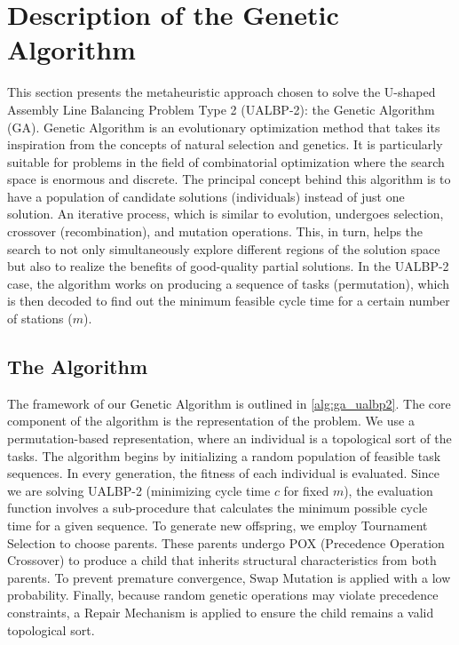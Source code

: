 \documentclass[12pt,a4paper]{article}
\begin{document}
\section{Description of the Genetic Algorithm}
This section presents the metaheuristic approach chosen to solve the U-shaped Assembly Line Balancing Problem Type 2 (UALBP-2): the Genetic Algorithm (GA). Genetic Algorithm is an evolutionary optimization method that takes its inspiration from the concepts of natural selection and genetics. It is particularly suitable for problems in the field of combinatorial optimization where the search space is enormous and discrete.
\newline
The principal concept behind this algorithm is to have a population of candidate solutions (individuals) instead of just one solution. An iterative process, which is similar to evolution, undergoes selection, crossover (recombination), and mutation operations. This, in turn, helps the search to not only simultaneously explore different regions of the solution space but also to realize the benefits of good-quality partial solutions. In the UALBP-2 case, the algorithm works on producing a sequence of tasks (permutation), which is then decoded to find out the minimum feasible cycle time for a certain number of stations ($m$).

\par
\subsection{The Algorithm}
The framework of our Genetic Algorithm is outlined in \cref{alg:ga_ualbp2}.
The core component of the algorithm is the representation of the problem. We use a permutation-based representation, where an individual is a topological sort of the tasks.
The algorithm begins by initializing a random population of feasible task sequences. In every generation, the fitness of each individual is evaluated. Since we are solving UALBP-2 (minimizing cycle time $c$ for fixed $m$), the evaluation function involves a sub-procedure that calculates the minimum possible cycle time for a given sequence.
To generate new offspring, we employ Tournament Selection to choose parents. These parents undergo POX (Precedence Operation Crossover) to produce a child that inherits structural characteristics from both parents. To prevent premature convergence, Swap Mutation is applied with a low probability. Finally, because random genetic operations may violate precedence constraints, a Repair Mechanism is applied to ensure the child remains a valid topological sort.
\end{document}
